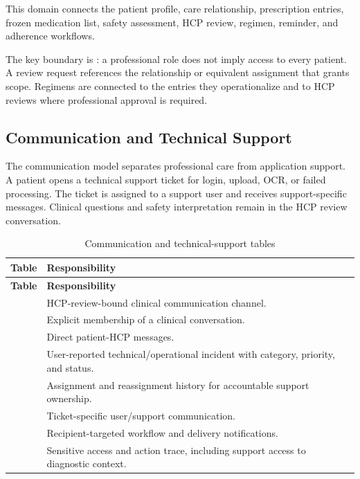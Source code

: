 This domain connects the patient profile, care relationship, prescription entries, frozen medication list, safety assessment, HCP review, regimen, reminder, and adherence workflows.


The key boundary is : a professional role does not imply access to every patient. A review request references the relationship or equivalent assignment that grants scope. Regimens are connected to the entries they operationalize and to HCP reviews where professional approval is required.

\subsection{Communication and Technical Support}

The communication model separates professional care from application support. A patient opens a technical support ticket for login, upload, OCR, or failed processing. The ticket is assigned to a support user and receives support-specific messages. Clinical questions and safety interpretation remain in the HCP review conversation.


\begin{longtable}{L{4.5cm}L{10.8cm}}
\caption{Communication and technical-support tables}\label{tab:support-tables}\\
\toprule
\textbf{Table} & \textbf{Responsibility}\\
\midrule
\endfirsthead
\toprule
\textbf{Table} & \textbf{Responsibility}\\
\midrule
\endhead
{} & HCP-review-bound clinical communication channel.\\
 & Explicit membership of a clinical conversation.\\
 & Direct patient-HCP messages.\\
 & User-reported technical/operational incident with category, priority, and status.\\
 & Assignment and reassignment history for accountable support ownership.\\
 & Ticket-specific user/support communication.\\
 & Recipient-targeted workflow and delivery notifications.\\
 & Sensitive access and action trace, including support access to diagnostic context.\\
\bottomrule
\end{longtable}

